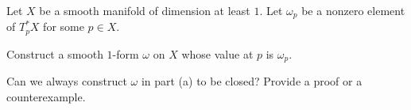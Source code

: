 Let $X$ be a smooth manifold of dimension at least $1$. Let $\omega_p$
be a nonzero element of $T_p^*X$ for some $p\in X$. 
\begin{alist}
\item Construct a smooth $1$-form $\omega$ on $X$ whose value at $p$ is 
$\omega_p$. 
\item Can we always construct $\omega$ in part (a) to be closed? Provide 
a proof or a counterexample.
\end{alist}

